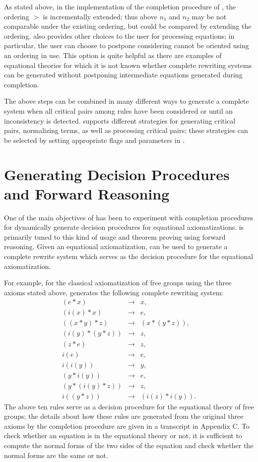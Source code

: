 As stated above, in the implementation of the completion
procedure of \ERRL, the ordering $>$ is incrementally extended;
thus above $n_1$ and $n_2$ may be not comparable under the
existing ordering, but could be compared by extending the
ordering. \RRL also provides other choices to the user for
processing equations; in particular, the user can choose to
postpone considering %
cannot be oriented using an ordering in use. This option is quite
helpful as there are examples of equational theories for which it
is not known whether complete rewriting systems can be generated
without postponing intermediate equations generated during
completion.

The above steps can be combined in many different ways to
generate a complete system when all critical pairs among rules
have been considered or until an inconsistency is detected.  \RRL
supports different strategies for generating critical pairs,
normalizing terms, as well as processing critical pairs; these
strategies can be selected by setting appropriate flags and
parameters in \ERRL.

\section{Generating Decision Procedures and Forward Reasoning}

One of the main objectives of \RRL has been to experiment with
completion procedures for dynamically generate decision
procedures for equational axiomatizations. \RRL is primarily
tuned to this kind of usage and theorem proving using forward
reasoning. Given an equational axiomatization, \RRL can be used
to generate a complete rewrite system which serves as the
decision procedure for the equational axiomatization.

For example, for the classical axiomatization of free groups
using the three axioms stated above, \RRL generates the following
complete rewriting system:  
\[\begin{array}{rcl}
   (e * x) & \rightarrow & x, \\
   (i(x) * x) & \rightarrow & e, \\
   ((x * y) * z) & \rightarrow & (x * (y * z)), \\
   (i(y) * (y * z)) & \rightarrow & z, \\
   (z * e) & \rightarrow & z, \\
    i(e) & \rightarrow & e, \\
    i(i(y)) & \rightarrow & y, \\
   (y * i(y)) & \rightarrow & e, \\
   (y * (i(y) * z)) & \rightarrow & z, \\
    i((y * z)) & \rightarrow & (i(z) * i(y)).
\end{array}\]
The above ten rules serve as a decision procedure for the
equational theory of free groups; the details about how these
rules are generated from the original three axioms by the
completion procedure are given in a transcript in Appendix C. To
check whether an equation is in the equational theory or not, it
is sufficient to compute the normal forms of the two sides of the
equation and check whether the normal forms are the same or not.

